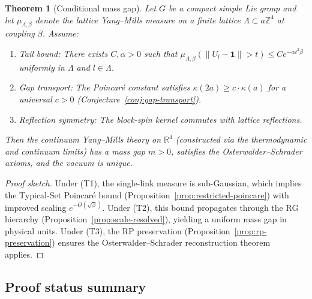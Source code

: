 \documentclass[12pt,a4paper]{article}
\theoremstyle{definition}
\theoremstyle{plain}
\newtheorem{theorem}[definition]{Theorem}
\theoremstyle{remark}
\begin{document}
\begin{theorem}[Conditional mass gap]
\label{thm:conditional-gap}
Let $G$ be a compact simple Lie group and let $\mu_{\Lambda,\beta}$ denote the lattice Yang--Mills measure on a finite lattice $\Lambda \subset a\mathbb{Z}^4$ at coupling $\beta$. Assume:
\begin{enumerate}
\item[\textup{(T1)}] \emph{Tail bound:} There exists $C, \alpha > 0$ such that $\mu_{\Lambda,\beta}(\|U_l - \mathbf{1}\| > t) \leq C e^{-\alpha t^2 \beta}$ uniformly in $\Lambda$ and $l \in \Lambda$.
\item[\textup{(T2)}] \emph{Gap transport:} The Poincar\'e constant satisfies $\kappa(2a) \geq c \cdot \kappa(a)$ for a universal $c > 0$ (Conjecture~\ref{conj:gap-transport}).
\item[\textup{(T3)}] \emph{Reflection symmetry:} The block-spin kernel commutes with lattice reflections.
\end{enumerate}
Then the continuum Yang--Mills theory on $\mathbb{R}^4$ (constructed via the thermodynamic and continuum limits) has a mass gap $m > 0$, satisfies the Osterwalder--Schrader axioms, and the vacuum is unique.
\end{theorem}

\begin{proof}[Proof sketch]
Under (T1), the single-link measure is sub-Gaussian, which implies the Typical-Set Poincar\'e bound (Proposition~\ref{prop:restricted-poincare}) with improved scaling $e^{-O(\sqrt{\beta})}$. Under (T2), this bound propagates through the RG hierarchy (Proposition~\ref{prop:scale-resolved}), yielding a uniform mass gap in physical units. Under (T3), the RP preservation (Proposition~\ref{prop:rp-preservation}) ensures the Osterwalder--Schrader reconstruction theorem applies.
\end{proof}

\subsection*{Proof status summary}
\end{document}
